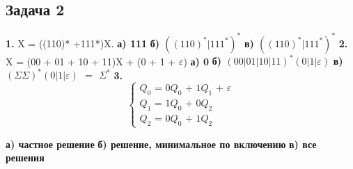 \documentclass[a4paper,14pt]{article} %
\begin{document}
\subsection{Задача 2}
\textbf{1.} X = ((110)* +111*)X.
\newline
\textbf{а) 111} \textbf{б) $((110)^*|111^*)^*$} \textbf{в) $((110)^*|111^*)^*$}
\newline
\textbf{2.} X = (00 + 01 + 10 + 11)X + (0 + 1 + $\varepsilon$)
\newline
\textbf{а) 0} 
\textbf{б) $(00|01|10|11)^*(0|1|\varepsilon)$} 
\textbf{в) $(\Sigma \Sigma)^*(0|1|\varepsilon)$ $=$ $\Sigma^*$}
\newline
\textbf{3.} 
\begin{equation*}
     \begin{cases}
       \text{$Q_0$ = 0$Q_0$ + 1$Q_1$ + $\varepsilon$}\\
       \text{$Q_1$ = 1$Q_0$ + 0$Q_2$}               \\
       \text{$Q_2$ = 0$Q_0$ + 1$Q_2$}
     \end{cases}
\end{equation*}

\textbf{а) частное решение}
\textbf{б) решение, минимальное по включению}
\textbf{в) все решения}
\end{document}
